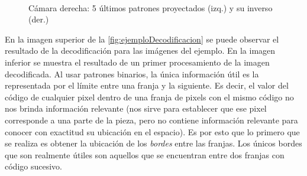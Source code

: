 \begin{figure}[!bth]
{        }
        \\
        \caption{Cámara derecha: 5 últimos patrones proyectados (izq.) y su inverso (der.)}
        \label{fig:ejemploProyeccionCamaraDerecha5a9}
\end{figure}

En la imagen superior de la \autoref{fig:ejemploDecodificacion} se puede observar el resultado de la decodificación para las imágenes del ejemplo. En la imagen inferior se muestra el resultado de un primer procesamiento de la imagen decodificada. Al usar patrones binarios, la única información útil es la representada por el límite entre una franja y la siguiente. Es decir, el valor del código de cualquier pixel dentro de una franja de pixels con el mismo código no nos brinda información relevante (nos sirve para establecer que ese pixel corresponde a una parte de la pieza, pero no contiene información relevante para conocer con exactitud su ubicación en el espacio). Es por esto que lo primero que se realiza es obtener la ubicación de los \emph{bordes} entre las franjas. Los únicos bordes que son realmente útiles son aquellos que se encuentran entre dos franjas con código sucesivo. 

